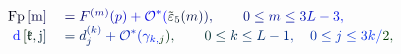 \documentclass[12pt]{article}
\begin{document}
\makeatletter
\renewcommand*{\@textcolor}[3]{%
  \protect\leavevmode
  \begingroup
    \color#1{#2}#3%
  \endgroup
}
\makeatother
\begin{displaymath}
\begin{array} {rl} { \mathrm { \mathcolor[RGB]{0,0,15}{F} \mathcolor[RGB]{0,0,30}{p} } \mathcolor[RGB]{0,0,45}{\left[} \mathrm { \mathcolor[RGB]{0,0,60}{m} } \mathcolor[RGB]{0,0,75}{\right]} } & { { } \mathcolor[RGB]{0,0,90}{=} \mathcolor[RGB]{0,0,105}{F} ^ { \mathcolor[RGB]{0,0,120}{(} \mathcolor[RGB]{0,0,135}{m} \mathcolor[RGB]{0,0,150}{)} } \mathcolor[RGB]{0,0,165}{(} \mathcolor[RGB]{0,0,180}{p} \mathcolor[RGB]{0,0,195}{)} \mathcolor[RGB]{0,0,210}{+} \mathcal { \mathcolor[RGB]{0,0,225}{O} } ^ { \mathcolor[RGB]{0,0,240}{*} } \mathcolor[RGB]{0,0,255}{(} {\mathcolor[RGB]{0,15,0}{\tilde { \mathcolor[RGB]{0,15,15}{\varepsilon} } }} _ { \mathcolor[RGB]{0,15,30}{5} } \mathcolor[RGB]{0,15,45}{(} \mathcolor[RGB]{0,15,60}{m} \mathcolor[RGB]{0,15,75}{)} \mathcolor[RGB]{0,15,90}{)} \mathcolor[RGB]{0,15,105}{,} \qquad \mathcolor[RGB]{0,15,120}{0} \mathcolor[RGB]{0,15,135}{\leq} \mathcolor[RGB]{0,15,150}{m} \mathcolor[RGB]{0,15,165}{\leq} \mathcolor[RGB]{0,15,180}{3} \mathcolor[RGB]{0,15,195}{L} \mathcolor[RGB]{0,15,210}{-} \mathcolor[RGB]{0,15,225}{3} \mathcolor[RGB]{0,15,240}{,} } \\ { \mathrm { \mathcolor[RGB]{0,15,255}{d} } \mathcolor[RGB]{0,30,0}{\left[} \mathfrak { \mathcolor[RGB]{0,30,15}{k} } \mathcolor[RGB]{0,30,30}{,} \mathrm { \mathcolor[RGB]{0,30,45}{j} } \mathcolor[RGB]{0,30,60}{\right]} } & { { } \mathcolor[RGB]{0,30,75}{=} \mathcolor[RGB]{0,30,90}{d} _ { \mathcolor[RGB]{0,30,105}{j} } ^ { \mathcolor[RGB]{0,30,120}{(} \mathcolor[RGB]{0,30,135}{k} \mathcolor[RGB]{0,30,150}{)} } \mathcolor[RGB]{0,30,165}{+} \mathcal { \mathcolor[RGB]{0,30,180}{O} } ^ { \mathcolor[RGB]{0,30,195}{*} } \mathcolor[RGB]{0,30,210}{(} \mathcolor[RGB]{0,30,225}{\gamma} _ { \mathcolor[RGB]{0,30,240}{k} \mathcolor[RGB]{0,30,255}{,} \mathcolor[RGB]{0,45,0}{j} } \mathcolor[RGB]{0,45,15}{)} \mathcolor[RGB]{0,45,30}{,} \qquad \mathcolor[RGB]{0,45,45}{0} \mathcolor[RGB]{0,45,60}{\leq} \mathcolor[RGB]{0,45,75}{k} \mathcolor[RGB]{0,45,90}{\leq} \mathcolor[RGB]{0,45,105}{L} \mathcolor[RGB]{0,45,120}{-} \mathcolor[RGB]{0,45,135}{1} \mathcolor[RGB]{0,45,150}{,} \quad \mathcolor[RGB]{0,45,165}{0} \mathcolor[RGB]{0,45,180}{\leq} \mathcolor[RGB]{0,45,195}{j} \mathcolor[RGB]{0,45,210}{\leq} \mathcolor[RGB]{0,45,225}{3} \mathcolor[RGB]{0,45,240}{k} \mathcolor[RGB]{0,45,255}{/} \mathcolor[RGB]{0,60,0}{2} \mathcolor[RGB]{0,60,15}{,} } \end{array}
\end{displaymath}
\end{document}
